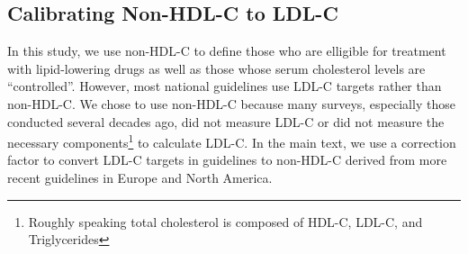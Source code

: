 \documentclass[12pt]{article}
\begin{document}
\begin{appendix}
\begin{refsection}
\begin{landscape}

\end{landscape}
    
    \newpage

    \subsection{Calibrating Non-HDL-C to LDL-C}
    In this study, we use non-HDL-C to define those who are elligible for treatment with lipid-lowering drugs as well as those whose serum cholesterol levels are ``controlled''. However, most national guidelines use LDL-C targets rather than non-HDL-C. We chose to use non-HDL-C because many surveys, especially those conducted several decades ago, did not measure LDL-C or did not measure the necessary components\footnote{Roughly speaking total cholesterol is composed of HDL-C, LDL-C, and Triglycerides} to calculate LDL-C. In the main text, we use a correction factor to convert LDL-C targets in guidelines to non-HDL-C derived from more recent guidelines in Europe and North America. 
    

\end{refsection}
\end{appendix}
\end{document}
